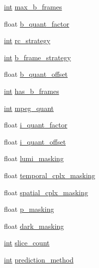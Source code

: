 \begin{DoxyCompactItemize}
\item 
\hyperlink{xmltok_8h_a5a0d4a5641ce434f1d23533f2b2e6653}{int} \hyperlink{struct_a_v_codec_context_a3e5334a611a3e2a6a653805bb9e2d4d4}{max\+\_\+b\+\_\+frames}
\item 
float \hyperlink{struct_a_v_codec_context_a40a7fdf60f853d9140bbe1204a66efb2}{b\+\_\+quant\+\_\+factor}
\item 
\hyperlink{xmltok_8h_a5a0d4a5641ce434f1d23533f2b2e6653}{int} \hyperlink{struct_a_v_codec_context_aa243eb5ac9606ee7d0e1e8402ffcb289}{rc\+\_\+strategy}
\item 
\hyperlink{xmltok_8h_a5a0d4a5641ce434f1d23533f2b2e6653}{int} \hyperlink{struct_a_v_codec_context_a64625af3f41e59bf3cf58be910a0cd3b}{b\+\_\+frame\+\_\+strategy}
\item 
float \hyperlink{struct_a_v_codec_context_a31a2ef78cf186083c2c676dda8e226db}{b\+\_\+quant\+\_\+offset}
\item 
\hyperlink{xmltok_8h_a5a0d4a5641ce434f1d23533f2b2e6653}{int} \hyperlink{struct_a_v_codec_context_a686a77363668795c15c87b532cc455fa}{has\+\_\+b\+\_\+frames}
\item 
\hyperlink{xmltok_8h_a5a0d4a5641ce434f1d23533f2b2e6653}{int} \hyperlink{struct_a_v_codec_context_a1ee77728beef26e1b3b6ff3cc9b27433}{mpeg\+\_\+quant}
\item 
float \hyperlink{struct_a_v_codec_context_aef7017818f06f053f2e63fe759b30eb1}{i\+\_\+quant\+\_\+factor}
\item 
float \hyperlink{struct_a_v_codec_context_afe9b149e17b9e28823ab3cf9732b990d}{i\+\_\+quant\+\_\+offset}
\item 
float \hyperlink{struct_a_v_codec_context_ae14fedf2fb0f6bda26a1badae5f8aeb4}{lumi\+\_\+masking}
\item 
float \hyperlink{struct_a_v_codec_context_a8fccee6f69d7ddf5c01d3042bd2772b3}{temporal\+\_\+cplx\+\_\+masking}
\item 
float \hyperlink{struct_a_v_codec_context_af79ff5dc9b33e370267f406dd2d5dc67}{spatial\+\_\+cplx\+\_\+masking}
\item 
float \hyperlink{struct_a_v_codec_context_a906b4bb56c38c49ef2de171ccdc55e30}{p\+\_\+masking}
\item 
float \hyperlink{struct_a_v_codec_context_a94bc3962f63a607a7d26d927f9bffb10}{dark\+\_\+masking}
\item 
\hyperlink{xmltok_8h_a5a0d4a5641ce434f1d23533f2b2e6653}{int} \hyperlink{struct_a_v_codec_context_a5ab4f688d837387c83315fba6027a43a}{slice\+\_\+count}
\item 
\hyperlink{xmltok_8h_a5a0d4a5641ce434f1d23533f2b2e6653}{int} \hyperlink{struct_a_v_codec_context_abfe2f66459911679409d0b223fcbd522}{prediction\+\_\+method}

\end{DoxyCompactItemize}
